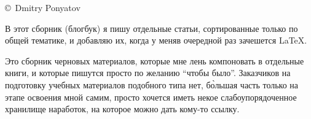 
\copyright\ Dmitry Ponyatov 
\bigskip

В этот сборник (блогбук) я пишу отдельные статьи, сортированные только по общей
тематике, и добавляю их, когда у меняв очередной раз зачешется \LaTeX.

Это сборник черновых материалов, которые мне лень компоновать в отдельные
книги, и которые пишутся просто по желанию ``чтобы было''. Заказчиков на
подготовку учебных материалов подобного типа нет, б\`{о}льшая часть только на
этапе освоения мной самим, просто хочется иметь некое
слабоупорядоченное хранилище наработок, на которое можно дать кому-то ссылку.
